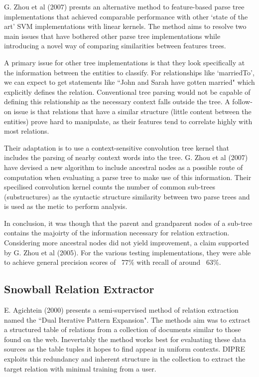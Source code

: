 \documentclass{ecmm427_assignment}
\begin{document}
G. Zhou et al (2007) presnts an alternative method to feature-based parse tree implementations that achieved comparable performance with other `state of the art' SVM implementations with linear kernels. The method aims to resolve two main issues that have bothered other parse tree implementations while introducing a novel way of comparing similarities between features trees.

A primary issue for other tree implementations is that they look specifically at the information between the entities to classify. For relationships like `marriedTo', we can expect to get statements like ``John and Sarah have gotten married" which explicitly defines the relation. Conventional tree parsing would not be capable of defining this relationship as the necessary context falls outside the tree. A follow-on issue is that relations that have a  similar structure (little content between the entities) prove hard to manipulate, as their features tend to correlate highly with most relations.

Their adaptation is to use a context-sensitive convolution tree kernel that includes the parsing of nearby context words into the tree. G. Zhou et al (2007) have devised a new algorithm to include ancestral nodes as a possible route of computation when evaluating a parse tree to make use of this information. Their specilised convolution kernel counts the number of common sub-trees (substructures) as the syntactic structure similarity between two parse trees and is used as the metic to perform analysis.

In conclusion, it was though that the parent and grandparent nodes of a sub-tree contains the majoirty of the information necessary for relation extraction. Considering more ancestral nodes did not yield improvement, a claim supported by G. Zhou et al (2005). For the various testing implementations, they were able to achieve general precision scores of ~77\% with recall of around ~63\%. 

\subsection{Snowball Relation Extractor}

E. Agichtein (2000) presents a  semi-supervised method of relation extraction named the ``Dual Iterative Pattern Expansion". The methods aim was to extract a structured table of relations from a collection of documents similar to those found on the web. Inevertably the method works best for evaluating these data sources as the table tuples it hopes to find appear in uniform contexts. DIPRE exploits this redundancy and inherent structure in the collection to extract the target relation with minimal training from a user.
\end{document}
